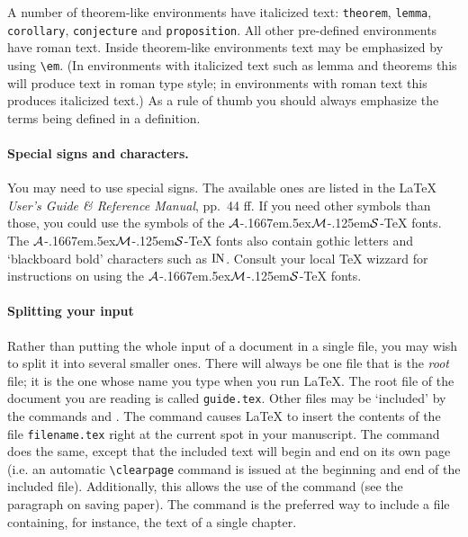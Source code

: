 A number of theorem-like environments have italicized text:
\verb|theorem|, \verb|lemma|, \verb|corollary|, \verb|conjecture|
and \verb|proposition|. All other pre-defined environments have roman text.
Inside theorem-like environments text may be emphasized by
using \verb|\em|. (In environments with italicized text such as lemma
and theorems this will produce text in roman type style; in 
environments with roman text this produces italicized text.)
As a rule of thumb you should always emphasize the terms being
defined in a definition.

\paragraph*{Special signs and characters.}
\newcommand{\AmSTeX}{%
{$\cal A$}\kern-.1667em\lower.5ex\hbox
  {$\cal M$}\kern-.125em{$\cal S$}-\TeX
}
You may need to use special signs. The available ones are listed
in the \LaTeX{} {\em User's Guide \& Reference Manual\/}, pp.~44 ff.
If you need other symbols than those, you could use the symbols
of the \AmSTeX{} fonts. The  \AmSTeX{} fonts also contain gothic letters
and `blackboard bold' characters such as ${\rm I}\hskip -.3pt{\rm N}$. Consult
your local \TeX{} wizzard for instructions on using the \AmSTeX{} fonts.

\paragraph*{Splitting your input}
Rather than putting the whole input of a document in a single file, you
may wish to split it into several smaller ones.
There will always be one file that is the {\em root} file; it is the one
whose name you type when you run \LaTeX{}.
The root file of the document you are reading is called \verb|guide.tex|.
Other files may be `included' by the commands \verb|| and \verb||.
The command \verb|| causes \LaTeX{} to insert the contents
of the file \verb|filename.tex| right at the current spot in your manuscript.
The command \verb|| does the same, except that the
included text will begin and end on its own page (i.e. an automatic
\verb|\clearpage| command is issued at the beginning and end of the included
file).
Additionally, this allows the use of the \verb|| command
(see the paragraph on saving paper).
The \verb|| command is the preferred way to include a file containing,
for instance, the text of a single chapter.

